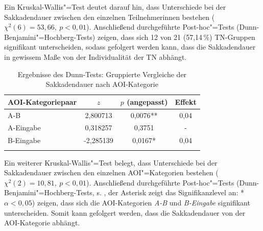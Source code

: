 
Ein Kruskal-Wallis"=Test deutet darauf hin, dass Unterschiede bei der Sakkadendauer zwischen den einzelnen Teilnehmer{\textperiodcentered}innen bestehen ($\chi^2(6) = 53,66,\allowbreak\ p < 0,01$). Anschließend durchgeführte Post-hoc"=Tests (Dunn-Benjamini"=Hochberg-Tests) zeigen, dass sich 12 von 21 (57,14\,\%) TN-Gruppen signifikant unterscheiden, sodass gefolgert werden kann, dass die Sakkadendauer in gewissem Maße von der Individualität der TN abhängt.\largerpage


\begin{table}
    \begin{tabular}{lS[table-format=-1.6]S[table-format=1.4{**}]c}
    \lsptoprule
        {AOI-Kategoriepaar} & {$z$} & {$p$ (angepasst)} & {Effekt}\\\midrule
        A-B & 2,800713 & 0,0076{**} & 0,04 \\ 
        A-Eingabe & 0,318257 & 0,3751 & - \\ 
        B-Eingabe  &  -2,285139 & 0,0167{*} & 0,04 \\
        \lspbottomrule
        \end{tabular}
        \caption{Ergebnisse des Dunn-Tests: Gruppierte Vergleiche der Sakkadendauer nach AOI-Kategorie}
    \label{tab:DeDe:dunntest-sacdur}
\end{table}


Ein weiterer Kruskal-Wallis"=Test belegt, dass Unterschiede bei der Sakkadendauer zwischen den einzelnen AOI"=Kategorien bestehen ($\chi^2(2) = 10,81,\allowbreak\ p < 0,01$). Anschließend durchgeführte Post-hoc"=Tests (Dunn-Benjamini"=Hochberg-Tests, s. , der Asterisk zeigt das Signifikanzlevel an: * $\alpha{} < 0,05$) zeigen, dass sich die AOI-Kategorien \emph{A-B} und \emph{B-Eingabe} signifikant unterscheiden. Somit kann gefolgert werden, dass die Sakkadendauer von der AOI-Kategorie abhängt.


